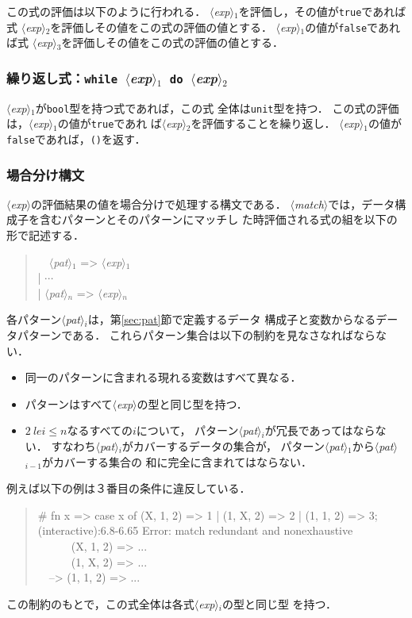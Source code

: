 \documentclass{jbook}
\newcommand{\code}[1]{\mbox{\large\tt #1}}
\newcommand{\nonterm}[1]{\mbox{$\langle$}{\it #1}\mbox{$\rangle$}}
\newcommand{\term}[1]{\mbox{{\tt #1}}}
\newcommand{\myem}{\mbox{\ \ }}
\newenvironment{program}{\begin{quote}\begin{tt}}%
                        {\end{tt}\end{quote}}
\begin{document}
	この式の評価は以下のように行われる．
	\nonterm{exp}$_1$を評価し，その値が\code{true}であれば式
\nonterm{exp}$_2$を評価しその値をこの式の評価の値とする．
	\nonterm{exp}$_1$の値が\code{false}であれば式
\nonterm{exp}$_3$を評価しその値をこの式の評価の値とする．

\subsubsection{繰り返し式：\term{while}\ \nonterm{exp}$_1$\ \term{do}\ \nonterm{exp}$_2$}

	\nonterm{exp}$_1$が\code{bool}型を持つ式であれば，この式
全体は\code{unit}型を持つ．
	この式の評価は，\nonterm{exp}$_1$の値が\code{true}であれ
ば\nonterm{exp}$_2$を評価することを繰り返し．
	\nonterm{exp}$_1$の値が\code{false}であれば，\code{()}を返す．

\subsubsection{場合分け構文}

	\nonterm{exp}の評価結果の値を場合分けで処理する構文である．
	\nonterm{match}では，データ構成子を含むパターンとそのパターンにマッチし
た時評価される式の組を以下の形で記述する．
\begin{program}
\myem  \nonterm{pat}$_1$ => \nonterm{exp}$_1$
\\
| $\cdots$
\\
| \nonterm{pat}$_n$ => \nonterm{exp}$_n$
\end{program}
	各パターン\nonterm{pat}$_i$は，第\ref{sec:pat}節で定義するデータ
構成子と変数からなるデータパターンである．
	これらパターン集合は以下の制約を見なさなればならない．
\begin{itemize}
\item 同一のパターンに含まれる現れる変数はすべて異なる．
\item パターンはすべて\nonterm{exp}の型と同じ型を持つ．
\item $2\ le i \le n$なるすべての$i$について，
パターン\nonterm{pat}$_i$が冗長であってはならない．
	すなわち\nonterm{pat}$_i$がカバーするデータの集合が，
パターン\nonterm{pat}$_1$から\nonterm{pat}$_{i-1}$がカバーする集合の
和に完全に含まれてはならない．
\end{itemize}
	例えば以下の例は３番目の条件に違反している．
\begin{program}
\# fn x => case x of (X, 1, 2) => 1 | (1, X, 2) => 2 | (1, 1, 2) => 3;
\\
(interactive):6.8-6.65 Error: match redundant and nonexhaustive
\\
\myem\myem\myem  (X, 1, 2) => ...
\\
\myem\myem\myem  (1, X, 2) => ...
\\
\myem --> (1, 1, 2) => ...
\end{program}
	この制約のもとで，この式全体は各式\nonterm{exp}$_i$の型と同じ型
を持つ．
\end{document}
